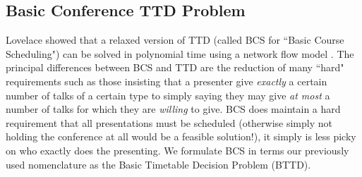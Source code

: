 \documentclass[]{article}
\theoremstyle{definition}
\theoremstyle{remark}
\numberwithin{equation}{section}
\begin{document}
\subsection{Basic Conference TTD Problem}
Lovelace showed that a relaxed version of TTD (called BCS for ``Basic Course Scheduling") can be solved in polynomial time using a network flow model \cite{lovelace2010}. The principal differences between BCS and TTD are the reduction of many ``hard" requirements such as those insisting that a presenter give \emph{exactly} a certain number of talks of a certain type to simply saying they may give \emph{at most} a number of talks for which they are \emph{willing} to give. BCS does maintain a hard requirement that all presentations must be scheduled (otherwise simply not holding the conference at all would be a feasible solution!), it simply is less picky on who exactly does the presenting. We formulate BCS in terms our previously used nomenclature as the Basic Timetable Decision Problem (BTTD).
\end{document}
